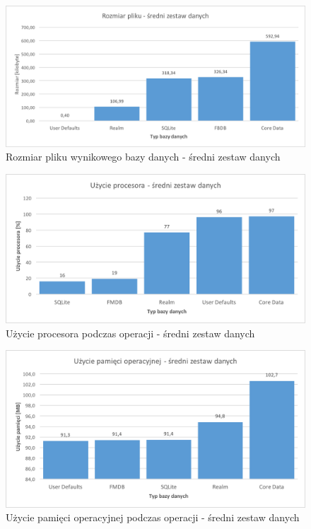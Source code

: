 \begin{figure}[h]
\centering
	\includegraphics[width=15cm]{img/save_data/save_file_medium.png}
	\caption{Rozmiar pliku wynikowego bazy danych - średni zestaw danych}
	\label{fig: medium-save-file-size}
\end{figure}

\newpage

\begin{figure}[h]
\centering
	\includegraphics[width=15cm]{img/save_data/save_cpu_medium.png}
	\caption{Użycie procesora podczas operacji - średni zestaw danych}
	\label{fig: medium-save-cpu}
\end{figure}

\begin{figure}[h]
\centering
	\includegraphics[width=15cm]{img/save_data/save_ram_medium.png}
	\caption{Użycie pamięci operacyjnej podczas operacji - średni zestaw danych}
	\label{fig: medium-save-ram}
\end{figure}

